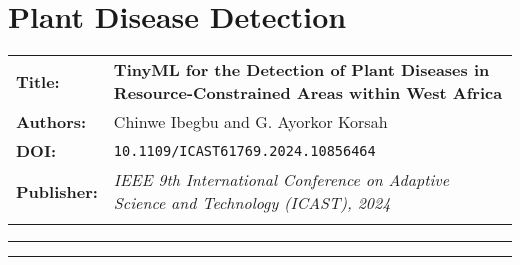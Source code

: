 \documentclass[../main]{subfiles}
\begin{document}
\chapter{Plant Disease Detection} \label{chp:}


\begin{center}

    \begin{tabularx} {\textwidth} {
            >{\bfseries}m{2.0cm}X
        }

        Title: & \textbf{TinyML for the Detection of Plant Diseases in Resource-Constrained Areas within West Africa}
        \\

        Authors: & Chinwe Ibegbu and G. Ayorkor Korsah
        \\

        DOI: & \texttt{10.1109/ICAST61769.2024.10856464}

        \\

        Publisher: & \textit{IEEE 9th International Conference on Adaptive Science and Technology (ICAST), 2024} \vfill
        \\


        \\


    \end{tabularx}

\end{center}

\begin{center}
    \vspace{-0.75cm}
    \rule{\textwidth}{0.75pt}
\end{center}



\begin{center}
    \vspace{-0.25cm}
    \rule{\textwidth}{0.75pt}
\end{center}





\end{document}

